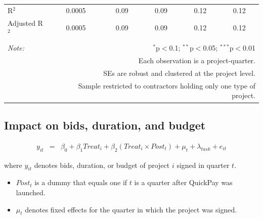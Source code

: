 \documentclass[
]{article}
\providecommand{\tightlist}{%
  \setlength{\itemsep}{0pt}\setlength{\parskip}{0pt}}
\begin{document}
\begin{table}[H]
\begin{tabular}{@{\extracolsep{-2pt}}lccccc}
R$^{2}$ & 0.0005 & 0.09 & 0.09 & 0.12 & 0.12 \\ 
Adjusted R$^{2}$ & 0.0005 & 0.09 & 0.09 & 0.12 & 0.12 \\ 
\hline 
\hline \\[-1.8ex] 
\textit{Note:}  & \multicolumn{5}{r}{$^{*}$p$<$0.1; $^{**}$p$<$0.05; $^{***}$p$<$0.01} \\ 
 & \multicolumn{5}{r}{Each observation is a project-quarter.} \\ 
 & \multicolumn{5}{r}{SEs are robust and clustered at the project level.} \\ 
 & \multicolumn{5}{r}{Sample restricted to contractors holding only one type of project.} \\ 
\end{tabular} 
\end{table}

\hypertarget{impact-on-bids-duration-and-budget}{%
\subsection{Impact on bids, duration, and
budget}\label{impact-on-bids-duration-and-budget}}

\[ \begin{aligned}
y_{it} &=& \beta_0 + \beta_1 Treat_i + \beta_2 (Treat_i \times Post_t) +\mu_t+ \lambda_{task}+ e_{it}
\end{aligned}\]

where \(y_{it}\) denotes bids, duration, or budget of project \(i\)
signed in quarter \(t\).

\begin{itemize}
\tightlist
\item
  \(Post_t\) is a dummy that equals one if \(t\) is a quarter after
  QuickPay was launched.
\item
  \(\mu_t\) denotes fixed effects for the quarter in which the project
  was signed.
\end{itemize}
\end{document}
